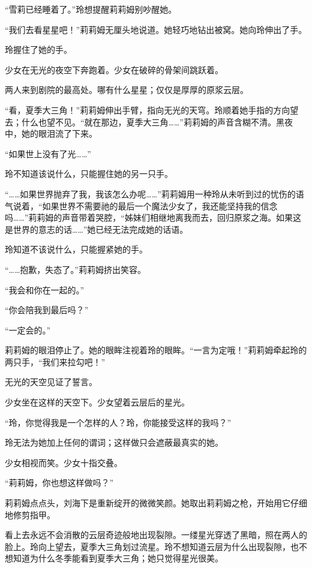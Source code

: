 “雪莉已经睡着了。”玲想提醒莉莉姆别吵醒她。

“我们去看星星吧！”莉莉姆无厘头地说道。她轻巧地钻出被窝。她向玲伸出了手。

玲握住了她的手。

少女在无光的夜空下奔跑着。少女在破碎的骨架间跳跃着。

两人来到剧院的最高处。哪有什么星星；仅仅是厚厚的原浆云层。

“看，夏季大三角！”莉莉姆伸出手臂，指向无光的天穹。玲顺着她手指的方向望去；什么也望不见。“就在那边，夏季大三角……”莉莉姆的声音含糊不清。黑夜中，她的眼泪流了下来。

“如果世上没有了光……”

玲不知道该说什么，只能握住她的另一只手。

“……如果世界抛弃了我，我该怎么办呢……”莉莉姆用一种玲从未听到过的忧伤的语气说着，“如果世界不需要祂的最后一个魔法少女了，我还能坚持我的信念吗……”莉莉姆的声音带着哭腔，“姊妹们相继地离我而去，回归原浆之海。如果这是世界的意志的话……”她已经无法完成她的话语。

玲知道不该说什么，只能握紧她的手。

“……抱歉，失态了。”莉莉姆挤出笑容。

“我会和你在一起的。”

“你会陪我到最后吗？”

“一定会的。”

莉莉姆的眼泪停止了。她的眼眸注视着玲的眼眸。“一言为定哦！”莉莉姆牵起玲的两只手，“我们来拉勾吧！”

无光的天空见证了誓言。

少女坐在这样的天空下。少女望着云层后的星光。

“玲，你觉得我是一个怎样的人？玲，你能接受这样的我吗？”

玲无法为她加上任何的谓词；这样做只会遮蔽最真实的她。

少女相视而笑。少女十指交叠。

“莉莉姆，你也想这样做吗？”

莉莉姆点点头，刘海下是重新绽开的微微笑颜。她取出莉莉姆之枪，开始用它仔细地修剪指甲。

看上去永远不会消散的云层奇迹般地出现裂隙。一缕星光穿透了黑暗，照在两人的脸上。玲向上望去，夏季大三角划过流星。玲不想知道云层为什么出现裂隙，也不想知道为什么冬季能看到夏季大三角；她只觉得星光很美。
